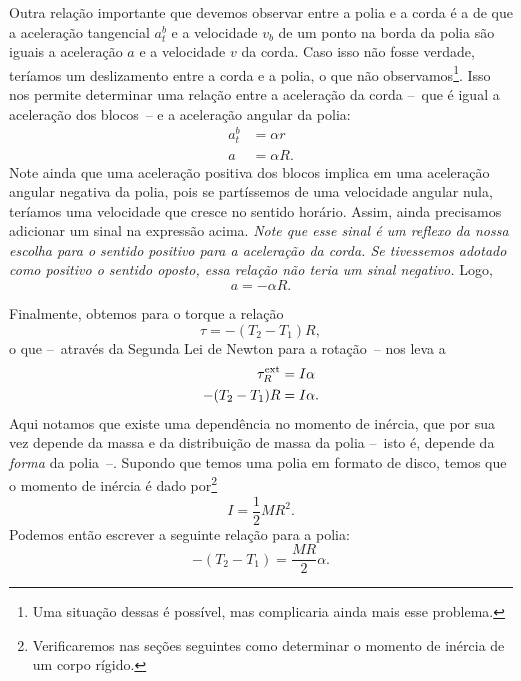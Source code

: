 Outra relação importante que devemos observar entre a polia e a corda é a de que a aceleração tangencial $a_t^b$ e a velocidade $v_b$ de um ponto na borda da polia são iguais a aceleração $a$ e a velocidade $v$ da corda. Caso isso não fosse verdade, teríamos um deslizamento entre a corda e a polia, o que não observamos\footnote{Uma situação dessas é possível, mas complicaria ainda mais esse problema.}. Isso nos permite determinar uma relação entre a aceleração da corda --~que é igual a aceleração dos blocos~-- e a aceleração angular da polia:
\begin{align}
    a_t^b &= \alpha r \\
    a &= \alpha R.
\end{align}
%
Note ainda que uma aceleração positiva dos blocos implica em uma aceleração angular negativa da polia, pois se partíssemos de uma velocidade angular nula, teríamos uma velocidade que cresce no sentido horário. Assim, ainda precisamos adicionar um sinal na expressão acima. \emph{Note que esse sinal é um reflexo da nossa escolha para o sentido positivo para a aceleração da corda. Se tivessemos adotado como positivo o sentido oposto, essa relação não teria um sinal negativo.} Logo,
\begin{equation}
        a = -\alpha R.
\end{equation}

Finalmente, obtemos para o torque a relação
\begin{equation}
    \tau = -(T_2 - T_1) R,
\end{equation}
%
o que --~através da Segunda Lei de Newton para a rotação~-- nos leva a
\begin{align}
    \tau_{R}^{\rm{ext}} &= I\alpha \\
    -(T_2 - T_1) R &= I \alpha.
\end{align}
%
Aqui notamos que existe uma dependência no momento de inércia, que por sua vez depende da massa e da distribuição de massa da polia --~isto é, depende da \emph{forma} da polia~--. Supondo que temos uma polia em formato de disco, temos que o momento de inércia é dado por\footnote{Verificaremos nas seções seguintes como determinar o momento de inércia de um corpo rígido.}
\begin{equation}
    I = \frac{1}{2} MR^2.
\end{equation}
%
Podemos então escrever a seguinte relação para a polia:
\begin{equation}
    -(T_2 - T_1) = \frac{MR}{2} \alpha.
\end{equation}

